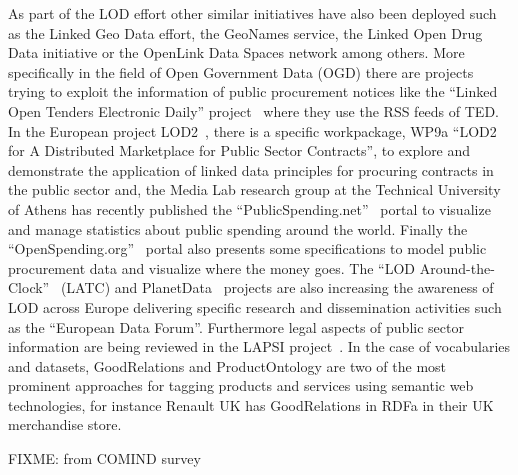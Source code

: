 As part of the LOD effort other similar initiatives have also been deployed such as the Linked Geo Data effort, 
the GeoNames service, the Linked Open Drug Data initiative or the OpenLink Data Spaces network among others. 
More specifically in the field of Open Government Data (OGD) there are projects trying to exploit the 
information of public procurement notices like the ``Linked Open Tenders Electronic Daily'' project~\cite{loted}
where they use the RSS feeds of TED.  In the European project LOD2~\cite{lod2-project}, there is a specific workpackage, 
WP9a ``LOD2 for A Distributed Marketplace for Public Sector Contracts'', to explore and demonstrate the 
application of linked data principles for procuring contracts in the public sector and, 
the Media Lab research group at the Technical University of Athens has recently published the 
``PublicSpending.net''~\cite{publicspending} portal to visualize and manage statistics about public spending around the world. Finally the 
``OpenSpending.org''~\cite{open-spending} portal also presents some specifications to model public procurement data and 
visualize where the money goes. The ``LOD Around-the-Clock''~\cite{latc-project} (LATC) and PlanetData~\cite{planet-data-project} projects are also increasing the awareness of 
LOD across Europe delivering specific research and dissemination activities such as the 
``European Data Forum''. Furthermore legal aspects of public sector information are being reviewed in the 
LAPSI project~\cite{lapsi-project}. In the case of vocabularies and datasets, GoodRelations 
and ProductOntology are two of the most prominent approaches for tagging products and services using semantic web technologies, 
for instance Renault UK has GoodRelations in RDFa in their UK merchandise store.

FIXME: from COMIND survey